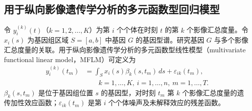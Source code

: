 \subsection{用于纵向影像遗传学分析的多元函数型回归模型}

令 $y_i^{(k)}(t)$（$k=1,2,\ldots,K$）为第 $i$ 个个体在时刻 $t$ 的第 $k$ 个影像汇总度量。令 $x_i(s)$ 为基因组区域 $S=[a,b]$ 中基因 $G$ 的基因型谱。研究基因 $G$ 与多个影像汇总度量的关联。用于纵向影像遗传学分析的多元函数型线性模型（multivariate functional linear model，MFLM）可定义为
\begin{equation}
\begin{aligned}
y_i^{(k)}(t_m)&=\int_Sx_i(s)\beta_k(s,t_m)\,ds+\varepsilon_{ik}(t_m),\\
&\qquad k=1,\ldots,K,\ i=1,\ldots,n,\ m=1,\ldots,T.
\end{aligned}\tag{6.182}
\end{equation}
$\beta_k(s,t_m)$ 是位于基因组位置 $s$ 的基因型，对时刻 $t_m$ 第 $k$ 个影像汇总度量的遗传加性效应函数；$\varepsilon_{ik}(t_m)$ 是第 $i$ 个个体噪声及未解释效应的残差函数。

